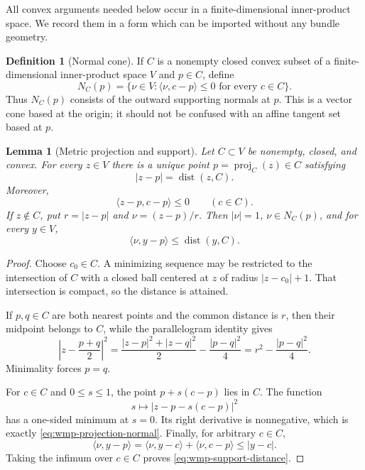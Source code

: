 \documentclass[10pt]{coll-l}
\newcommand{\dist}{\operatorname{dist}}
\newtheorem{lemma}[theorem]{Lemma}
\theoremstyle{definition}
\newtheorem{definition}[theorem]{Definition}
\theoremstyle{remark}
\numberwithin{section}{chapter}
\numberwithin{equation}{chapter}
\begin{document}
All convex arguments needed below occur in a finite-dimensional inner-product
space.  We record them in a form which can be imported without any bundle
geometry.

\begin{definition}[Normal cone]
\label{def:wmp-normal-cone}
If $C$ is a nonempty closed convex subset of a finite-dimensional
inner-product space $V$ and $p\in C$, define
\[
  N_C(p)=
  \bigl\{\nu\in V:\langle\nu,c-p\rangle\leq0
                  \text{ for every }c\in C\bigr\}.
\]
Thus $N_C(p)$ consists of the outward supporting normals at $p$.  This is a
vector cone based at the origin; it should not be confused with an affine
tangent set based at $p$.
\end{definition}

\begin{lemma}[Metric projection and support]
\label{lem:wmp-projection-support}
Let $C\subset V$ be nonempty, closed, and convex.  For every $z\in V$ there
is a unique point $p=\operatorname{proj}_C(z)\in C$ satisfying
\[
     |z-p|=\dist(z,C).
\]
Moreover,
\begin{equation}
     \langle z-p,c-p\rangle\leq0
     \qquad(c\in C).                                      \label{eq:wmp-projection-normal}
\end{equation}
If $z\notin C$, put $r=|z-p|$ and $\nu=(z-p)/r$.  Then
$|\nu|=1$, $\nu\in N_C(p)$, and for every $y\in V$,
\begin{equation}
     \langle\nu,y-p\rangle\leq\dist(y,C).                  \label{eq:wmp-support-distance}
\end{equation}
\end{lemma}

\begin{proof}
Choose $c_0\in C$.  A minimizing sequence may be restricted to the
intersection of $C$ with a closed ball centered at $z$ of radius
$|z-c_0|+1$.  That intersection is compact, so the distance is attained.

If $p,q\in C$ are both nearest points and the common distance is $r$, then
their midpoint belongs to $C$, while the parallelogram identity gives
\[
 \left|z-\frac{p+q}{2}\right|^2
   =\frac{|z-p|^2+|z-q|^2}{2}-\frac{|p-q|^2}{4}
   =r^2-\frac{|p-q|^2}{4}.
\]
Minimality forces $p=q$.

For $c\in C$ and $0\leq s\leq1$, the point $p+s(c-p)$ lies in $C$.
The function
\[
   s\longmapsto |z-p-s(c-p)|^2
\]
has a one-sided minimum at $s=0$.  Its right derivative is nonnegative,
which is exactly \eqref{eq:wmp-projection-normal}.  Finally, for arbitrary
$c\in C$,
\[
 \langle\nu,y-p\rangle
   =\langle\nu,y-c\rangle+\langle\nu,c-p\rangle
   \leq |y-c|.
\]
Taking the infimum over $c\in C$ proves
\eqref{eq:wmp-support-distance}.
\end{proof}
\end{document}
